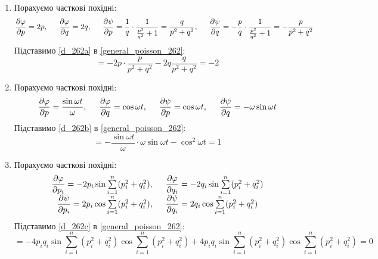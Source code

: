 \documentclass[a4paper,12pt]{article}
\newcommand\partiald[2]{\dfrac{\partial{#1}}{\partial{#2}}}
\newcommand\tab [1][0.5cm]{\hspace*{#1}}
\begin{document}
\begin{justify}
		\begin{enumerate}[label=\alph*)]
			\item Порахуємо часткові похідні:
				\begin{equation}
					\partiald{\varphi}{p}=2p,\tab \partiald{\varphi}{q}=2q,\tab \partiald{\psi}{p}=\dfrac1q\cdot\dfrac{1}{\frac{p^2}{q^2}+1}=\dfrac{q}{p^2+q^2},\tab \partiald{\psi}{q}=-\dfrac pq\cdot\dfrac{1}{\frac{p^2}{q^2}+1}=-\dfrac{p}{p^2+q^2}
					\label{d_262a}
				\end{equation}
				Підставимо \cref{d_262a} в \cref{general_poisson_262}:
				\begin{equation}
					[\varphi,\psi]=-2p\cdot \dfrac{p}{p^2+q^2}-2q\dfrac{q}{p^2+q^2}=-2
					\label{poisson_262a}
				\end{equation}
			\item Порахуємо часткові похідні:
				\begin{equation}
					\partiald{\varphi}{p}=\dfrac{\sin\omega t}{\omega},\tab \partiald{\varphi}{q}=\cos\omega t,\tab \partiald{\psi}{p}=\cos\omega t,\tab \partiald{\psi}{q}=-\omega\sin\omega t
					\label{d_262b}
				\end{equation}
				Підставимо \cref{d_262b} в \cref{general_poisson_262}:
				\begin{equation}
					[\varphi,\psi]=-\dfrac{\sin\omega t}{\omega}\cdot\omega\sin\omega t-\cos^2\omega t=1
					\label{poisson_262b}
				\end{equation}
			\item Порахуємо часткові похідні:
				\begin{equation}
					\begin{array}{c}
						\partiald{\varphi}{p_i}=-2p_i\sin\sum\limits_{i=1}^{n}(p_i^2+q_i^2),\tab\partiald{\varphi}{q_i}=-2q_i\sin\sum\limits_{i=1}^{n}(p_i^2+q_i^2)\\
						\partiald{\psi}{p_i}=2p_i\cos\sum\limits_{i=1}^{n}(p_i^2+q_i^2),\tab\partiald{\psi}{q_i}=2q_i\cos\sum\limits_{i=1}^{n}(p_i^2+q_i^2)
					\end{array}
					\label{d_262c}
				\end{equation}
				Підставимо \cref{d_262c} в \cref{general_poisson_262}:
				\begin{equation}
					[\varphi,\psi]=-4p_iq_i\sin\sum\limits_{i=1}^{n}(p_i^2+q_i^2)\cos\sum\limits_{i=1}^{n}(p_i^2+q_i^2)+4p_iq_i\sin\sum\limits_{i=1}^{n}(p_i^2+q_i^2)\cos\sum\limits_{i=1}^{n}(p_i^2+q_i^2)=0
					\label{poisson_262c}
				\end{equation}
		\end{enumerate}

\end{justify}
\end{document}
